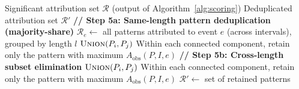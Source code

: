 \begin{algorithm}[!ht]
\caption{Item Deduplication (Step 5)}
\label{alg:dedup}
\begin{algorithmic}[1]
\Require Significant attribution set $\mathcal{R}$ (output of Algorithm~\ref{alg:scoring})
\Ensure Deduplicated attribution set $\mathcal{R}'$
\Statex \textbf{// Step 5a: Same-length pattern deduplication (majority-share)}
    \State $\mathcal{R}_{e} \gets$ all patterns attributed to event $e$ (across intervals), grouped by length $l$
                \State $\Call{Union}{P_i, P_j}$ 
            \EndIf
        \EndFor
        \State Within each connected component, retain only the pattern with maximum $A_{\text{obs}}(P, I, e)$
    \EndFor
\EndFor
\Statex \textbf{// Step 5b: Cross-length subset elimination}
            \State $\Call{Union}{P_i, P_j}$ 
        \EndIf
    \EndFor
    \State Within each connected component, retain only the pattern with maximum $A_{\text{obs}}(P, I, e)$
\EndFor
\State \Return $\mathcal{R}' \gets$ set of retained patterns
\end{algorithmic}
\end{algorithm}
